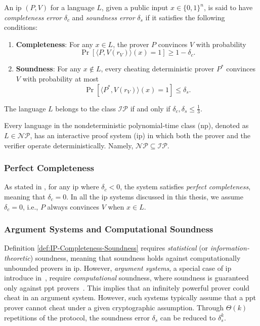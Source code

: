 \begin{definition}\label{def:IP-Completeness-Soundness}
	An \gls{ip} \( (P, V) \) for a language \( L \), given a public input \( x \in \{0,1\}^n \), is said to have \textit{completeness error} \( \delta_c \) and \textit{soundness error} \( \delta_s \) if it satisfies the following conditions:
	\vspace{-0.5\baselineskip} %
	\begin{enumerate}[leftmargin=2em]
		\item \textbf{Completeness}: For any \( x \in L \), the prover \( P \) convinces \( V \) with probability
		\[
		\Pr [\langle P, V(r_V) \rangle (x) = 1] \geq 1 - \delta_c.
		\]
		\item \textbf{Soundness}: For any \( x \notin L \), every cheating deterministic prover \( P^* \) convinces \( V \) with probability at most
		\[
		\Pr [\langle P^*, V(r_V) \rangle (x) = 1] \leq \delta_s.
		\]
	\end{enumerate}
	\vspace{-0.5\baselineskip} %
The language \( L \) belongs to the class \( \mathcal{IP} \) if and only if \( \delta_c, \delta_s \leq \frac{1}{3} \).

\end{definition}

\begin{remark}
Every language in the nondeterministic polynomial-time class (\gls{np}), denoted as \( L \in \mathcal{NP} \), has an interactive proof system (\gls{ip}) in which both the prover and the verifier operate deterministically. Namely, $\mathcal{NP} \subseteq \mathcal{IP}$.
\end{remark}

\subsubsection{Perfect Completeness}
As stated in \cite{Thaler2022Proofs}, for any \gls{ip} where \( \delta_c < 0 \), the system satisfies \textit{perfect completeness}, meaning that \( \delta_c = 0 \). In all the \gls{ip} systems discussed in this thesis, we assume \(\delta_c = 0\), i.e.,  \( P \) always convinces \( V \) when \( x \in L \). 

\subsubsection{Argument Systems and Computational Soundness}
Definition \ref{def:IP-Completeness-Soundness} requires \textit{statistical} (or \textit{information-theoretic}) soundness, meaning that soundness holds against computationally unbounded provers in \gls{ip}. However, \textit{argument systems}, a special case of \gls{ip} introduce in~\cite{BRASSARD1988Minimum}, require \textit{computational} soundness, where soundness is guaranteed only against \gls{ppt} provers~\cite{Ben-Sasson2016IOP}. This implies that an infinitely powerful prover could cheat in an argument system. However, such systems typically assume that a \gls{ppt} prover cannot cheat under a given cryptographic assumption. Through $\Theta(k)$ repetitions of the protocol, the soundness error $\delta_s$ can be reduced to $\delta_s^k$.

